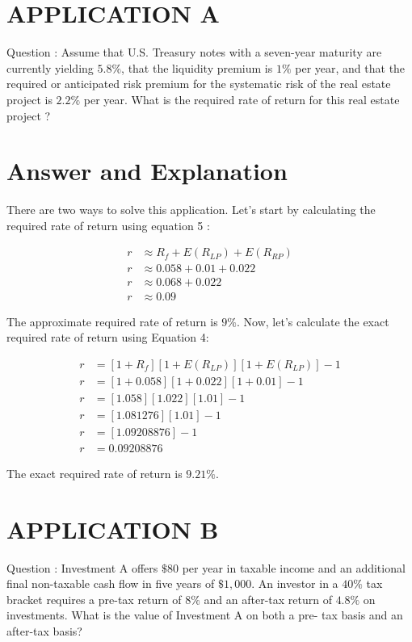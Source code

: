 \documentclass[11pt]{article}
\begin{document}
\section*{APPLICATION A}
Question : Assume that U.S. Treasury notes with a seven-year maturity are currently yielding $5.8 \%$, that the liquidity premium is $1 \%$ per year, and that the required or anticipated risk premium for the systematic risk of the real estate project is $2.2 \%$ per year. What is the required rate of return for this real estate project ?

\section*{Answer and Explanation}
There are two ways to solve this application.  Let's start by calculating the required rate of return using equation 5 :

$$
\begin{aligned}
r & \approx R_{f}+E\left(R_{L P}\right)+E\left(R_{R P}\right) \\
r & \approx 0.058+0.01+0.022 \\
r & \approx 0.068+0.022 \\
r & \approx 0.09
\end{aligned}
$$

The approximate required rate of return is $9 \%$. Now, let's calculate the exact required rate of return using Equation 4:

$$
\begin{aligned}
r & =\left[1+R_{f}\right]\left[1+E\left(R_{L P}\right)\right]\left[1+E\left(R_{L P}\right)\right]-1 \\
r & =[1+0.058][1+0.022][1+0.01]-1 \\
r & =[1.058][1.022][1.01]-1 \\
r & =[1.081276][1.01]-1 \\
r & =[1.09208876]-1 \\
r & =0.09208876
\end{aligned}
$$

The exact required rate of return is $9.21 \%$.

\section*{APPLICATION B}
Question : Investment A offers $\$ 80$ per year in taxable income and an additional final non-taxable cash flow in five years of $\$ 1,000$. An investor in a $40 \%$ tax bracket requires a pre-tax return of $8 \%$ and an after-tax return of $4.8 \%$ on investments. What is the value of Investment A on both a pre- tax basis and an after-tax basis?
\end{document}
